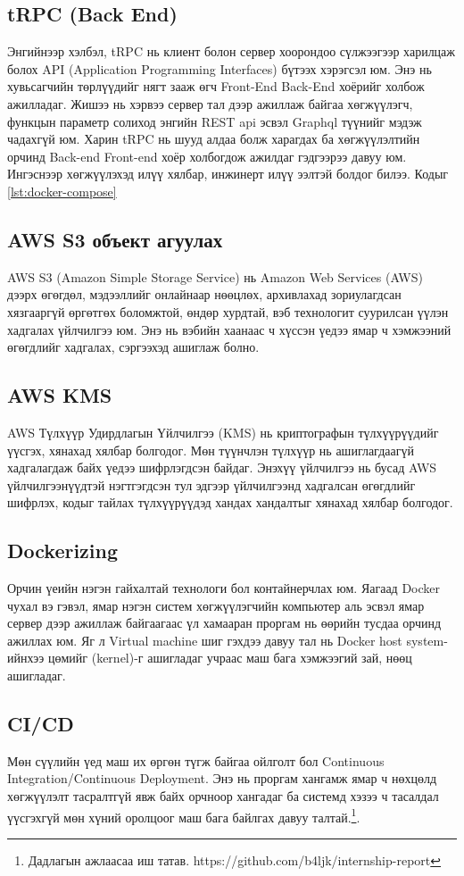 \subsection{tRPC (Back End)}

Энгийнээр хэлбэл, tRPC нь клиент болон сервер хоорондоо сүлжээгээр харилцаж болох API (Application Programming Interfaces) бүтээх хэрэгсэл юм. Энэ нь хувьсагчийн төрлүүдийг нягт зааж өгч Front-End Back-End хоёрийг холбож ажилладаг. Жишээ нь хэрвээ сервер тал дээр ажиллаж байгаа хөгжүүлэгч, функцын параметр солиход энгийн REST api эсвэл Graphql түүнийг мэдэж чадахгүй юм. Харин tRPC нь шууд алдаа болж харагдах ба хөгжүүлэлтийн орчинд Back-end Front-end хоёр холбогдож ажилдаг гэдгээрээ давуу юм. Ингэснээр хөгжүүлэхэд илүү хялбар, инжинерт илүү ээлтэй болдог билээ.
Кодыг \ref{lst:docker-compose}
\subsection{AWS S3 объект агуулах}
AWS S3 (Amazon Simple Storage Service) нь Amazon Web Services (AWS) дээрх өгөгдөл, мэдээллийг онлайнаар нөөцлөх, архивлахад зориулагдсан хязгааргүй өргөтгөх боломжтой, өндөр хурдтай, вэб технологит суурилсан үүлэн хадгалах үйлчилгээ юм. Энэ нь вэбийн хаанаас ч хүссэн үедээ ямар ч хэмжээний өгөгдлийг хадгалах, сэргээхэд ашиглаж болно.
\subsection{AWS KMS}
AWS Түлхүүр Удирдлагын Үйлчилгээ (KMS) нь криптографын түлхүүрүүдийг үүсгэх, хянахад хялбар болгодог. Мөн түүнчлэн түлхүүр нь ашиглагдаагүй хадгалагдаж байх үедээ шифрлэгдсэн байдаг.
Энэхүү үйлчилгээ нь бусад AWS үйлчилгээнүүдтэй нэгтгэгдсэн тул эдгээр үйлчилгээнд хадгалсан өгөгдлийг шифрлэх, кодыг тайлах түлхүүрүүдэд хандах хандалтыг хянахад хялбар болгодог.

\subsection{Dockerizing}
Орчин үеийн нэгэн гайхалтай технологи бол контайнерчлах юм. Яагаад Docker чухал вэ гэвэл, ямар нэгэн систем хөгжүүлэгчийн компьютер аль эсвэл ямар сервер дээр ажиллаж байгаагаас үл хамааран проргам нь өөрийн тусдаа орчинд ажиллах юм. Яг л Virtual machine шиг гэхдээ давуу тал нь Docker host system-ийнхээ цөмийг (kernel)-г ашигладаг учраас маш бага хэмжээгий зай, нөөц ашигладаг.
\subsection{CI/CD}
Мөн сүүлийн үед маш их өргөн түгж байгаа ойлголт бол Continuous Integration/Continuous Deployment.
Энэ нь проргам хангамж ямар ч нөхцөлд хөгжүүлэлт тасралтгүй явж байх орчноор хангадаг ба системд хэзээ ч тасалдал үүсгэхгүй мөн хүний оролцоог маш бага байлгах давуу талтай.\footnote{Дадлагын ажлаасаа иш татав. https://github.com/b4ljk/internship-report}.

